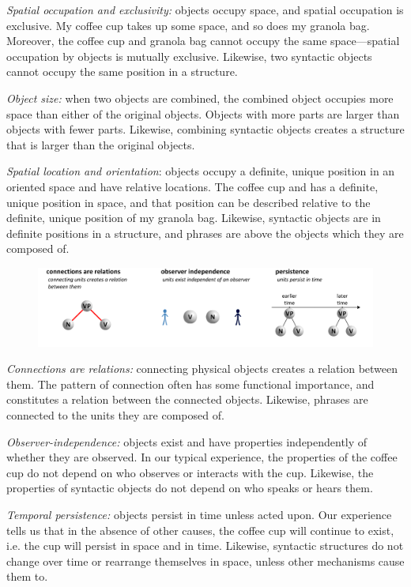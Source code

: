 \textit{Spatial occupation and exclusivity:} objects occupy space, and spatial occupation is exclusive. My coffee cup takes up some space, and so does my granola bag. Moreover, the coffee cup and granola bag cannot occupy the same space—spatial occupation by objects is mutually exclusive. Likewise, two syntactic objects cannot occupy the same position in a structure. 

\textit{Object size:} when two objects are combined, the combined object occupies more space than either of the original objects. Objects with more parts are larger than objects with fewer parts. Likewise, combining syntactic objects creates a structure that is larger than the original objects.

\textit{Spatial location and orientation}: objects occupy a definite, unique position in an oriented space and have relative locations. The coffee cup and has a definite, unique position in space, and that position can be described relative to the definite, unique position of my granola bag. Likewise, syntactic objects are in definite positions in a structure, and phrases are above the objects which they are composed of.

  
\begin{figure}
\includegraphics[width=\textwidth]{figures/Tilsen-img31.png}
\caption{\missingcaption}
\label{fig:}
\end{figure}
 

\textit{Connections are relations:} connecting physical objects creates a relation between them. The pattern of connection often has some functional importance, and constitutes a relation between the connected objects. Likewise, phrases are connected to the units they are composed of.

\textit{Observer-independence:} objects exist and have properties independently of whether they are observed. In our typical experience, the properties of the coffee cup do not depend on who observes or interacts with the cup. Likewise, the properties of syntactic objects do not depend on who speaks or hears them.

\textit{Temporal persistence:} objects persist in time unless acted upon. Our experience tells us that in the absence of other causes, the coffee cup will continue to exist, i.e. the cup will persist in space and in time. Likewise, syntactic structures do not change over time or rearrange themselves in space, unless other mechanisms cause them to.

